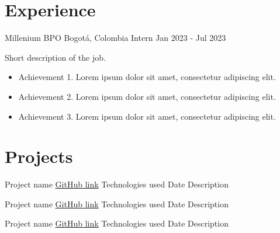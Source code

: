 
\section*{Experience}
\begin{entrylist}
    \entry
    {Millenium BPO}
    {Bogotá, Colombia}
    {Intern}
    {Jan 2023 - Jul 2023}
    {Short description of the job.
        \begin{itemize}
            \item Achievement 1. Lorem ipsum dolor sit amet, consectetur adipiscing elit.
            \item Achievement 2. Lorem ipsum dolor sit amet, consectetur adipiscing elit.
            \item Achievement 3. Lorem ipsum dolor sit amet, consectetur adipiscing elit.
        \end{itemize}
    }
\end{entrylist}

\section*{Projects}
\begin{entrylist}
    \entry
    {Project name}
    {\href{https://github.com/...}{GitHub link}}
    {Technologies used}
    {Date}
    {Description}

    \entry
    {Project name}
    {\href{https://github.com/...}{GitHub link}}
    {Technologies used}
    {Date}
    {Description}

    \entry
    {Project name}
    {\href{https://github.com/...}{GitHub link}}
    {Technologies used}
    {Date}
    {Description}
\end{entrylist}